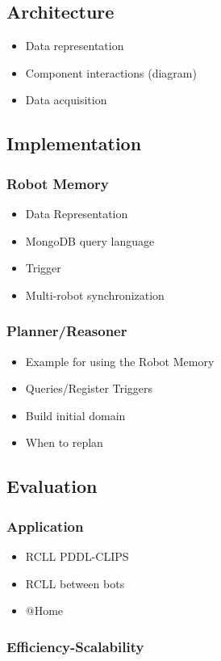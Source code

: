 \documentclass[a4paper,11pt]{article}
\begin{document}
\subsection{Architecture}
\begin{itemize}
\item Data representation
\item Component interactions (diagram)
\item Data acquisition
\end{itemize}


\subsection{Implementation}
\subsubsection{Robot Memory}
\begin{itemize}
\item Data Representation
\item MongoDB query language
\item Trigger
\item Multi-robot synchronization
\end{itemize}
\subsubsection{Planner/Reasoner}
\begin{itemize}
\item Example for using the Robot Memory
\item Queries/Register Triggers
\item Build initial domain
\item When to replan
\end{itemize}

\subsection{Evaluation}
\subsubsection{Application}
\begin{itemize}
\item RCLL PDDL-CLIPS
\item RCLL between bots
\item @Home
\end{itemize}
\subsubsection{Efficiency-Scalability}
\end{document}
